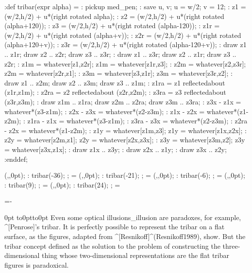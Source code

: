  \MT:def tribar(expr alpha) =
 \MT: pickup med_pen;
 \MT: save u, v; u = w/2; v = 12;
 \MT: z1 = (w/2,h/2) + u*(right rotated alpha);
 \MT: z2 = (w/2,h/2) + u*(right rotated (alpha+120));
 \MT: z3 = (w/2,h/2) + u*(right rotated (alpha-120));
 \MT: z1r = (w/2,h/2) + u*(right rotated (alpha+v));
 \MT: z2r = (w/2,h/2) + u*(right rotated (alpha+120+v));
 \MT: z3r = (w/2,h/2) + u*(right rotated (alpha-120+v));
 \MT: draw z1 .. z1r; draw z2 .. z2r; draw z3 .. z3r;
 \MT: draw z1 .. z3r; draw z2 .. z1r; draw z3 .. z2r;
 \MT: z1m = whatever[z1,z2r]; z1m = whatever[z1r,z3];
 \MT: z2m = whatever[z2,z3r]; z2m = whatever[z2r,z1];
 \MT: z3m = whatever[z3,z1r]; z3m = whatever[z3r,z2];
 \MT: draw z1 .. z2m; draw z2 .. z3m; draw z3 .. z1m;
 \MT: z1ra = z1 reflectedabout (z1r,z1m);
 \MT: z2ra = z2 reflectedabout (z2r,z2m);
 \MT: z3ra = z3 reflectedabout (z3r,z3m);
 \MT: draw z1m .. z1ra; draw z2m .. z2ra; draw z3m .. z3ra;
 \MT: z3x - z1x = whatever*(z3-z1m);
 \MT: z2x - z3x = whatever*(z2-z3m);
 \MT: z1x - z2x = whatever*(z1-z2m);
 \MT: z1ra - z1x = whatever*(z3-z1m);
 \MT: z3ra - z3x = whatever*(z2-z3m);
 \MT: z2ra - z2x = whatever*(z1-z2m);
 \MT: z1y = whatever[z1m,z3]; z1y = whatever[z1x,z2x];
 \MT: z2y = whatever[z2m,z1]; z2y = whatever[z2x,z3x];
 \MT: z3y = whatever[z3m,z2]; z3y = whatever[z3x,z1x];
 \MT: draw z1x .. z3y;
 \MT: draw z2x .. z1y;
 \MT: draw z3x .. z2y;
 \MT:enddef;

 \newdimen\tribar \tribar=75pt

 \MTbeginchar(\the\tribar,\the\tribar,0pt);
 \MT: tribar(-36);
 \MTendchar; =\box\MTbox
 \MTbeginchar(\the\tribar,\the\tribar,0pt);
 \MT: tribar(-21);
 \MTendchar; =\box\MTbox
 \MTbeginchar(\the\tribar,\the\tribar,0pt);
 \MT: tribar(-6);
 \MTendchar; =\box\MTbox
 \MTbeginchar(\the\tribar,\the\tribar,0pt);
 \MT: tribar(9);
 \MTendchar; =\box\MTbox
 \MTbeginchar(\the\tribar,\the\tribar,0pt);
 \MT: tribar(24);
 \MTendchar; =\box\MTbox

 =\hsize \advance{}-\tribar

\noindent{} 0pt 
  \hbox to0pt{\kern{}\vbox to0pt{%
  \kern-10pt\kern-9pt\kern-9pt\kern-12pt\vss}\hss}%
\indent
Even some optical illusions_{illusion} are paradoxes, for example,
^[Penrose]'s tribar. It is perfectly possible to represent the tribar on
a flat surface, as the figures, adapted from
^[Resnikoff]^(Resnikoff1989), show. But the tribar concept defined as
the solution to the problem of constructing the three-\allowhyphens
dimensional thing whose two-\allowhyphens dimensional representations
are the flat tribar figures is paradoxical.

